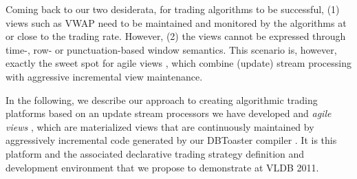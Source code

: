 Coming back to our two desiderata, for trading algorithms to be successful, (1)
views such as VWAP need to be maintained and monitored by the algorithms at or
close to the trading rate. However, (2) the views cannot be expressed through
time-, row- or punctuation-based window semantics.
This scenario is, however, exactly the sweet spot for agile views
\cite{KAK2011}, which combine (update) stream processing with aggressive
incremental view maintenance.

In the following, we describe our approach to creating algorithmic
trading platforms based on an update stream processors we have developed and
{\em agile views}\/ \cite{KAK2011}, which are materialized views
that are continuously maintained by aggressively incremental code generated
by our DBToaster compiler \cite{ahmad-vldb:09,koch-pods:10,KAK2011}.
It is this platform and the
associated declarative trading strategy definition and development environment
that we propose to demonstrate at VLDB 2011.


